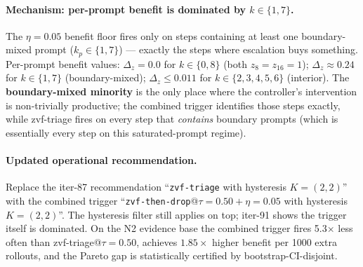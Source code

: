 \paragraph{Mechanism: per-prompt benefit is dominated by $k{\in}\{1,7\}$.}
The $\eta{=}0.05$ benefit floor fires only on steps containing at
least one boundary-mixed prompt ($k_p \in \{1, 7\}$) --- exactly
the steps where escalation buys something. Per-prompt benefit
values: $\Delta_z = 0.0$ for $k\in\{0,8\}$ (both $z_8 = z_{16} = 1$);
$\Delta_z \approx 0.24$ for $k\in\{1,7\}$ (boundary-mixed);
$\Delta_z \le 0.011$ for $k \in \{2, 3, 4, 5, 6\}$ (interior). The
\textbf{boundary-mixed minority} is the only place where the
controller's intervention is non-trivially productive; the
combined trigger identifies those steps exactly, while zvf-triage
fires on every step that \emph{contains} boundary prompts (which
is essentially every step on this saturated-prompt regime).

\paragraph{Updated operational recommendation.}
Replace the iter-87 recommendation ``\texttt{zvf-triage} with
hysteresis $K{=}(2,2)$'' with the combined trigger
``\texttt{zvf-then-drop}@$\tau{=}0.50{+}\eta{=}0.05$ with hysteresis
$K{=}(2,2)$''. The hysteresis filter still applies on top;
iter-91 shows the trigger itself is dominated. On the N2
evidence base the combined trigger fires 5.3$\times$ less often
than zvf-triage@$\tau{=}0.50$, achieves $1.85\times$ higher
benefit per 1000 extra rollouts, and the Pareto gap is
statistically certified by bootstrap-CI-disjoint.

